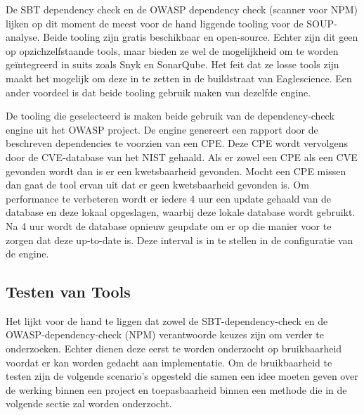 De SBT dependency check\citep{Albuch:z.d.} en de OWASP dependency check\citep{etnera:z.d.} (scanner voor NPM) lijken op dit moment de meest voor de hand liggende tooling voor de SOUP-analyse. Beide tooling zijn gratis beschikbaar en open-source. Echter zijn dit geen op opzichzelfstaande tools, maar bieden ze wel de mogelijkheid om te worden geïntegreerd in suits zoals Snyk en SonarQube. Het feit dat ze losse tools zijn maakt het mogelijk om deze in te zetten in de buildstraat van Eaglescience. Een ander voordeel is dat beide tooling gebruik maken van dezelfde engine.


De tooling die geselecteerd is maken beide gebruik van de dependency-check engine uit het OWASP project.
De engine genereert een rapport door de beschreven dependencies te voorzien van een CPE. Deze CPE wordt vervolgens door de CVE-database van het NIST gehaald. Als er zowel een CPE als een CVE gevonden wordt dan is er een kwetsbaarheid gevonden. Mocht een CPE missen dan gaat de tool ervan uit dat er geen kwetsbaarheid gevonden is. Om performance te verbeteren wordt er iedere 4 uur een update gehaald van de database en deze lokaal opgeslagen, waarbij deze lokale database wordt gebruikt. Na 4 uur wordt de database opnieuw geupdate om er op die manier voor te zorgen dat deze up-to-date is. Deze interval is in te stellen in de configuratie van de engine.

%
%

\subsection{Testen van Tools}\label{subsec:testen-van-tools}

Het lijkt voor de hand te liggen dat zowel de SBT-dependency-check en de OWASP-dependency-check (NPM) verantwoorde keuzes zijn om verder te onderzoeken. Echter dienen deze eerst te worden onderzocht op bruikbaarheid voordat er kan worden gedacht aan implementatie. Om de bruikbaarheid te testen zijn de volgende scenario's opgesteld die samen een idee moeten geven over de werking binnen een project en toepasbaarheid binnen een methode die in de volgende sectie zal worden onderzocht.

